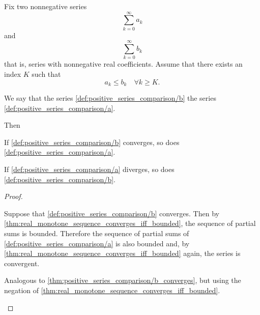 \begin{proposition}\label{thm:positive_series_comparison}\cite[]{Фихтенгольц1968/2}
  Fix two nonnegative series
  \begin{equation}\label{def:positive_series_comparison/a}
    \sum_{k=0}^\infty a_k
  \end{equation}
  and
  \begin{equation}\label{def:positive_series_comparison/b}
    \sum_{k=0}^\infty b_k
  \end{equation}
  that is, series with nonnegative real coefficients. Assume that there exists an index \( K \) such that
  \begin{equation*}
    a_k \leq b_k \quad\forall k \geq K.
  \end{equation*}

  We say that the series \cref{def:positive_series_comparison/b}  the series \cref{def:positive_series_comparison/a}.

  Then
  \begin{thmenum}
     If \cref{def:positive_series_comparison/b} converges, so does \cref{def:positive_series_comparison/a}.

     If \cref{def:positive_series_comparison/a} diverges, so does \cref{def:positive_series_comparison/b}.
  \end{thmenum}
\end{proposition}
\begin{proof}
  \begin{description}
     Suppose that \cref{def:positive_series_comparison/b} converges. Then by \cref{thm:real_monotone_sequence_converges_iff_bounded}, the sequence of partial sums is bounded. Therefore the sequence of partial sums of \cref{def:positive_series_comparison/a} is also bounded and, by \cref{thm:real_monotone_sequence_converges_iff_bounded} again, the series is convergent.

     Analogous to \cref{thm:positive_series_comparison/b_converges}, but using the negation of \cref{thm:real_monotone_sequence_converges_iff_bounded}.
  \end{description}
\end{proof}

